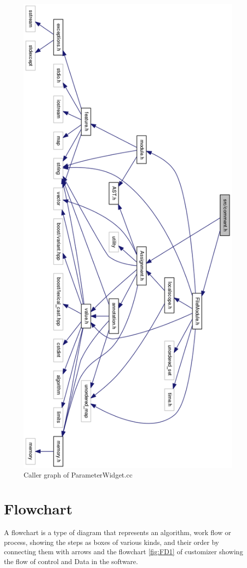 \begin{figure}
\centering
\includegraphics[width=\linewidth,height=1.35\columnwidth]{images/comment1}
\caption{Caller graph of ParameterWidget.cc}
\label{fig:comment1}
\end{figure}


\section{Flowchart}
A flowchart is a type of diagram that represents an algorithm, work flow or process, showing the steps as boxes of various kinds, and their order by connecting them with arrows
and the flowchart \ref{fig:FD1} of customizer showing the flow of control and Data in the software.

